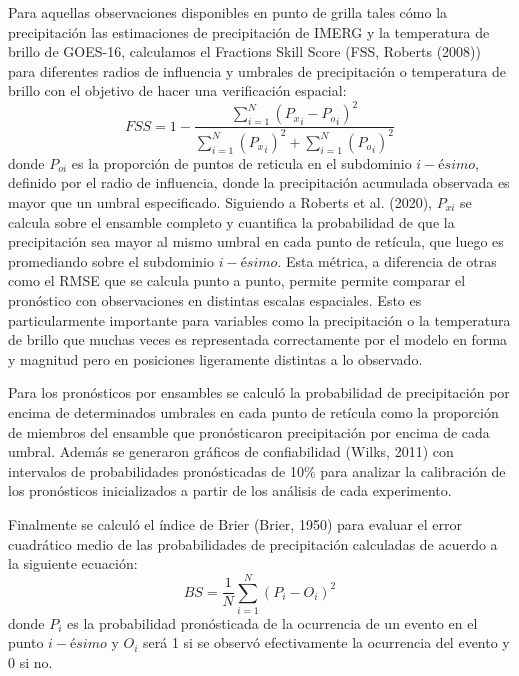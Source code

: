 \documentclass[12pt,oneside,a4paper]{reedthesis}
\begin{document}
Para aquellas observaciones disponibles en punto de grilla tales cómo la precipitación las estimaciones de precipitación de IMERG y la temperatura de brillo de GOES-16, calculamos el Fractions Skill Score (FSS, Roberts (2008)) para diferentes radios de influencia y umbrales de precipitación o temperatura de brillo con el objetivo de hacer una verificación espacial:
\begin{equation}
\mathit{FSS} = 1-\frac{\sum_{i=1}^{N} ({P_x}_i-{P_o}_i)^{2}}{\sum_{i=1}^{N} ({P_x}_i)^{2}+\sum_{i=1}^{N} ({P_o}_i)^{2}}
\label{eq:eq11}
\end{equation}
donde \(P_{oi}\) es la proporción de puntos de reticula en el subdominio \(i-ésimo\), definido por el radio de influencia, donde la precipitación acumulada observada es mayor que un umbral especificado. Siguiendo a Roberts et al. (2020), \(P_{xi}\) se calcula sobre el ensamble completo y cuantifica la probabilidad de que la precipitación sea mayor al mismo umbral en cada punto de retícula, que luego es promediando sobre el subdominio \(i-ésimo\). Esta métrica, a diferencia de otras como el RMSE que se calcula punto a punto, permite permite comparar el pronóstico con observaciones en distintas escalas espaciales. Esto es particularmente importante para variables como la precipitación o la temperatura de brillo que muchas veces es representada correctamente por el modelo en forma y magnitud pero en posiciones ligeramente distintas a lo observado.

Para los pronósticos por ensambles se calculó la probabilidad de precipitación por encima de determinados umbrales en cada punto de retícula como la proporción de miembros del ensamble que pronósticaron precipitación por encima de cada umbral. Además se generaron gráficos de confiabilidad (Wilks, 2011) con intervalos de probabilidades pronósticadas de 10\% para analizar la calibración de los pronósticos inicializados a partir de los análisis de cada experimento.

Finalmente se calculó el índice de Brier (Brier, 1950) para evaluar el error cuadrático medio de las probabilidades de precipitación calculadas de acuerdo a la siguiente ecuación:
\begin{equation}
\mathit{BS} = \frac{1}{N}\sum_{i=1}^{N} ({P_i}-{O_i})^{2}
\label{eq:eq13}
\end{equation}
donde \(P_i\) es la probabilidad pronósticada de la ocurrencia de un evento en el punto \(i-ésimo\) y \(O_i\) será 1 si se observó efectivamente la ocurrencia del evento y 0 si no.
\end{document}
